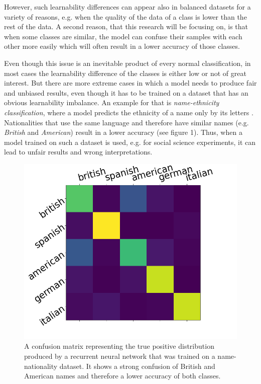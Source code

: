 \documentclass[journal]{IEEEtran}
\begin{document}
However, such learnability differences can appear also in balanced datasets for a variety of reasons, e.g. when the quality of the data of a class is lower than the rest of the data.
A second reason, that this research will be focusing on, is that when some classes are similar,
the model can confuse their samples with each other more easily which will often result in a lower accuracy of those classes.

Even though this issue is an inevitable product of every normal classification, in most cases the learnability difference of the classes is either low or not of great interest.
But there are more extreme cases in which a model needs to produce fair and unbiased results, even though it has to be trained on a dataset that has an obvious learnability imbalance. 
An example for that is \emph{name-ethnicity classification}, where a model predicts the ethnicity of a name only by its letters \cite{mateos2007review}. 
Nationalities that use the same language and therefore have similar names (e.g. \emph{British} and \emph{American}) result in a lower accuracy (see figure 1).
Thus, when a model trained on such a dataset is used, e.g. for social science experiments, it can lead to unfair results and wrong interpretations. 

\begin{figure}[h!]
        \includegraphics[width=\linewidth]{images/Figure_1.png}
        \caption{A confusion matrix representing the true positive distribution produced by a recurrent neural network that was trained on a name-nationality dataset.
                It shows a strong confusion of British and American names and therefore a lower accuracy of both classes.}
        \label{fig:tp_scores}
\end{figure}
\end{document}
